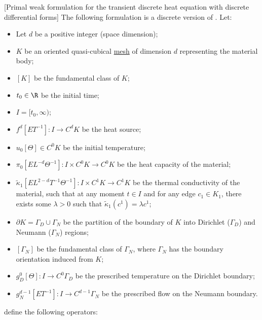 \begin{formulation}
  \label{idec/heat_transport/discrete/primal_weak_transient-formulation}
  [Primal weak formulation for the transient discrete heat equation
    with discrete differential forms]
  The following formulation is a discrete version of
  .
  Let:
  \begin{itemize}
    \item
      Let $d$ be a positive integer (space dimension);
    \item
      $K$ be an oriented quasi-cubical \hyperref[idec:mesh:definition]{mesh} of
      dimension $d$ representing the material body;
    \item
      $[K]$ be the fundamental class of $K$;
    \item
      $t_0 \in \R$ be the initial time;
    \item
      $I = [t_0, \infty)$;
    \item
      $f^d [E T^{-1}] \colon I \to C^d K$ be the heat source;
    \item
      $u_0 [\Theta] \in C^0 K$ be the initial temperature;
    \item
      $\pi_0 [E L^{-d} \Theta^{-1}] \colon I \times C^0 K \to C^0 K$
      be the heat capacity of the material;
    \item
      $\tilde{\kappa}_1 [E L^{2 - d} T^{-1} \Theta^{-1}]
      \colon I \times C^1 K \to C^1 K$
      be the thermal conductivity of the material, such that at any moment
      $t \in I$ and for any edge $c_1 \in K_1$, there exists some $\lambda > 0$
      such that $\tilde{\kappa}_1(c^1) = \lambda c^1$;
    \item
      $\partial K = \Gamma_D \cup \Gamma_N$ be the partition of the boundary of
      $K$ into Dirichlet ($\Gamma_D$) and Neumann ($\Gamma_N$) regions;
    \item
      $[\Gamma_N]$ be the fundamental class of $\Gamma_N$, where $\Gamma_N$
      has the boundary orientation induced from $K$;
    \item
      $g_D^0 [\Theta] \colon I \to C^0 \Gamma_D$
      be the prescribed temperature on the Dirichlet boundary;
    \item
      $g_N^{d - 1} [E T^{-1}] \colon I \to C^{d - 1} \Gamma_N$
      be the prescribed flow on the Neumann boundary.
  \end{itemize}
  define the following operators:
  \begin{subequations}
    \begin{alignat}{3}

\end{alignat}
\end{subequations}
\end{formulation}
